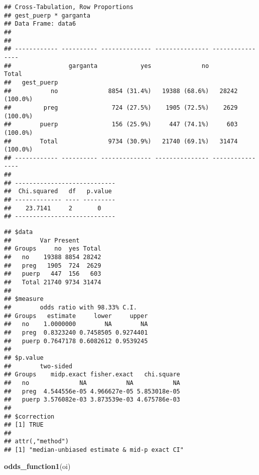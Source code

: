 \documentclass[
]{article}
\newenvironment{Shaded}{\begin{snugshade}}{\end{snugshade}}
\newcommand{\KeywordTok}[1]{\textcolor[rgb]{0.13,0.29,0.53}{\textbf{#1}}}
\newcommand{\NormalTok}[1]{#1}
\newcommand{\OperatorTok}[1]{\textcolor[rgb]{0.81,0.36,0.00}{\textbf{#1}}}
\newcommand{\StringTok}[1]{\textcolor[rgb]{0.31,0.60,0.02}{#1}}
\begin{document}
\begin{verbatim}
## Cross-Tabulation, Row Proportions  
## gest_puerp * garganta  
## Data Frame: data6  
## 
## 
## ------------ ---------- -------------- --------------- ----------------
##                garganta            yes              no            Total
##   gest_puerp                                                           
##           no              8854 (31.4%)   19388 (68.6%)   28242 (100.0%)
##         preg               724 (27.5%)    1905 (72.5%)    2629 (100.0%)
##        puerp               156 (25.9%)     447 (74.1%)     603 (100.0%)
##        Total              9734 (30.9%)   21740 (69.1%)   31474 (100.0%)
## ------------ ---------- -------------- --------------- ----------------
## 
## ----------------------------
##  Chi.squared   df   p.value 
## ------------- ---- ---------
##    23.7141     2       0    
## ----------------------------
\end{verbatim}

\begin{Shaded}
\end{Shaded}

\begin{verbatim}
## $data
##        Var Present
## Groups     no  yes Total
##   no    19388 8854 28242
##   preg   1905  724  2629
##   puerp   447  156   603
##   Total 21740 9734 31474
## 
## $measure
##        odds ratio with 98.33% C.I.
## Groups   estimate     lower     upper
##   no    1.0000000        NA        NA
##   preg  0.8323240 0.7458505 0.9274401
##   puerp 0.7647178 0.6082612 0.9539245
## 
## $p.value
##        two-sided
## Groups    midp.exact fisher.exact   chi.square
##   no              NA           NA           NA
##   preg  4.544556e-05 4.966627e-05 5.853018e-05
##   puerp 3.576082e-03 3.873539e-03 4.675786e-03
## 
## $correction
## [1] TRUE
## 
## attr(,"method")
## [1] "median-unbiased estimate & mid-p exact CI"
\end{verbatim}

\begin{Shaded}
\begin{Highlighting}[]
\KeywordTok{odds_function1}\NormalTok{(oi)}
\end{Highlighting}
\end{Shaded}
\end{document}
